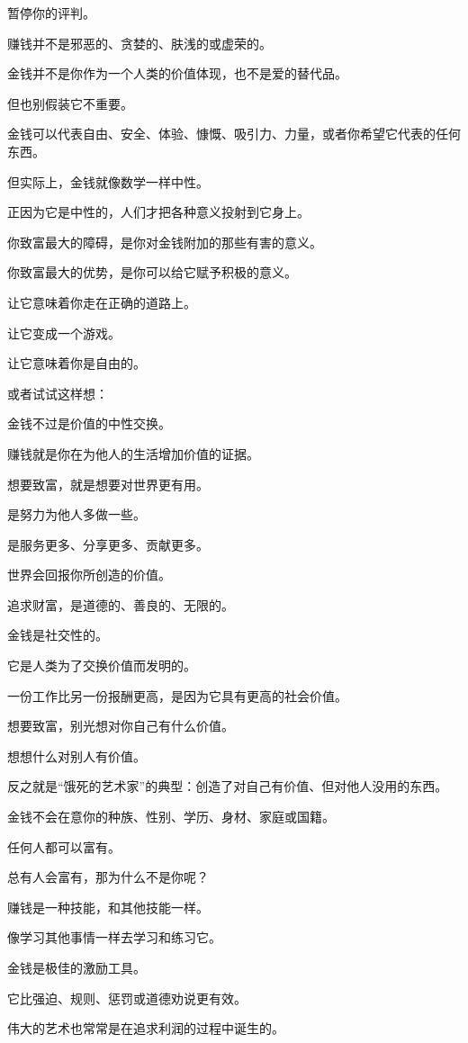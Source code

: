 \documentclass[
]{article}
\begin{document}
暂停你的评判。

赚钱并不是邪恶的、贪婪的、肤浅的或虚荣的。

金钱并不是你作为一个人类的价值体现，也不是爱的替代品。

但也别假装它不重要。

金钱可以代表自由、安全、体验、慷慨、吸引力、力量，或者你希望它代表的任何东西。

但实际上，金钱就像数学一样中性。

正因为它是中性的，人们才把各种意义投射到它身上。

你致富最大的障碍，是你对金钱附加的那些有害的意义。

你致富最大的优势，是你可以给它赋予积极的意义。

让它意味着你走在正确的道路上。

让它变成一个游戏。

让它意味着你是自由的。

或者试试这样想：

金钱不过是价值的中性交换。

赚钱就是你在为他人的生活增加价值的证据。

想要致富，就是想要对世界更有用。

是努力为他人多做一些。

是服务更多、分享更多、贡献更多。

世界会回报你所创造的价值。

追求财富，是道德的、善良的、无限的。

金钱是社交性的。

它是人类为了交换价值而发明的。

一份工作比另一份报酬更高，是因为它具有更高的社会价值。

想要致富，别光想对你自己有什么价值。

想想什么对别人有价值。

反之就是``饿死的艺术家''的典型：创造了对自己有价值、但对他人没用的东西。

金钱不会在意你的种族、性别、学历、身材、家庭或国籍。

任何人都可以富有。

总有人会富有，那为什么不是你呢？

赚钱是一种技能，和其他技能一样。

像学习其他事情一样去学习和练习它。

金钱是极佳的激励工具。

它比强迫、规则、惩罚或道德劝说更有效。

伟大的艺术也常常是在追求利润的过程中诞生的。
\end{document}
